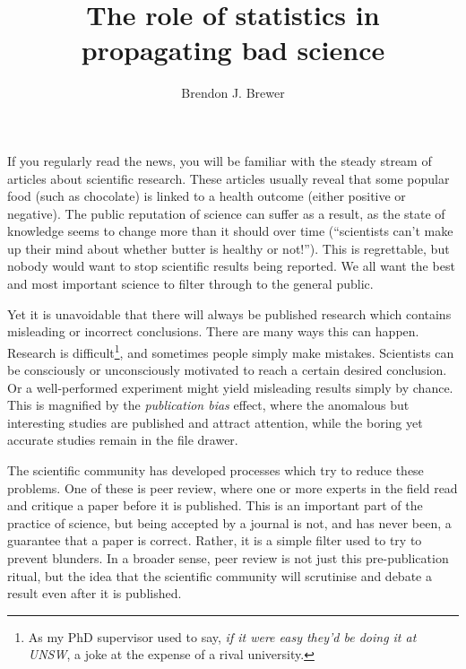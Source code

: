 \documentclass[a4paper, 12pt]{article}
\title{The role of statistics in propagating bad science}
\author{Brendon J. Brewer}
\begin{document}
\sffamily
\maketitle

If you regularly read the news, you will be familiar with the steady stream of
articles about scientific research. These articles usually reveal that some
popular food (such as chocolate)
is linked to a health outcome (either positive or negative).
The public reputation of science can suffer as
a result, as the state of knowledge seems to change more than it should
over time (``scientists can't make up their mind about whether butter is
healthy or not!''). This is regrettable,
but nobody would want to stop scientific results being reported. We all want
the best and most important science to filter through to the general public.

Yet it is unavoidable that there will always be
published research which contains misleading or incorrect conclusions.
There are many ways this can happen. Research is difficult\footnote{As my
PhD supervisor used to say, {\em if it were easy they'd be doing it at UNSW},
a joke at the expense of a rival university.}, and sometimes
people simply make mistakes.
Scientists can be consciously or
unconsciously motivated to reach a certain desired conclusion.
Or a well-performed experiment might yield
misleading results simply by chance. This is magnified by the
{\em publication bias} effect, where the anomalous but interesting studies
are published and attract attention, while the boring yet accurate studies
remain in the file drawer.

The scientific community has developed processes which try to reduce these
problems. One of these is peer review, where one or more experts in the field
read and critique a paper before it is published.
This is an important part of the practice of
science, but being accepted by a journal
is not, and has never been, a guarantee that a paper is correct. Rather, it
is a simple filter used to try to prevent blunders.
In a broader sense, peer review is not just this pre-publication ritual, but
the idea that the scientific community will scrutinise and debate a result
even after it is published.
\end{document}
